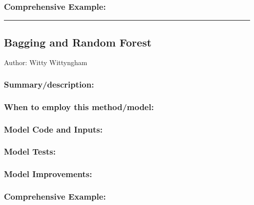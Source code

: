 \documentclass[
]{article}
\begin{document}
\hypertarget{comprehensive-example-10}{%
\subsubsection{Comprehensive Example:}\label{comprehensive-example-10}}

\begin{center}\rule{0.5\linewidth}{0.5pt}\end{center}

\hypertarget{bagging-and-random-forest}{%
\subsection{Bagging and Random Forest}\label{bagging-and-random-forest}}

Author: Witty Wittyngham

\hypertarget{summarydescription-11}{%
\subsubsection{Summary/description:}\label{summarydescription-11}}

\hypertarget{when-to-employ-this-methodmodel-11}{%
\subsubsection{When to employ this
method/model:}\label{when-to-employ-this-methodmodel-11}}

\hypertarget{model-code-and-inputs-11}{%
\subsubsection{Model Code and Inputs:}\label{model-code-and-inputs-11}}

\hypertarget{model-tests-11}{%
\subsubsection{Model Tests:}\label{model-tests-11}}

\hypertarget{model-improvements-11}{%
\subsubsection{Model Improvements:}\label{model-improvements-11}}

\hypertarget{comprehensive-example-11}{%
\subsubsection{Comprehensive Example:}\label{comprehensive-example-11}}
\end{document}
